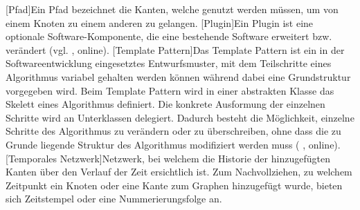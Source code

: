 \begin{acronym}
    [Pfad]{Ein Pfad bezeichnet die Kanten, welche genutzt werden müssen, um von einem Knoten zu einem anderen zu gelangen.}
    [Plugin]{Ein Plugin ist eine optionale Software-Komponente, die eine bestehende Software erweitert bzw. verändert (vgl. \citeauthor{wikipedia_plug-_2019} \citeyear{wikipedia_plug-_2019}, online).}
    [Template Pattern]{Das Template Pattern ist ein in der Softwareentwicklung eingesetztes Entwurfsmuster, mit dem Teilschritte eines Algorithmus variabel gehalten werden können während dabei eine Grundstruktur vorgegeben wird. Beim Template Pattern wird in einer abstrakten Klasse das Skelett eines Algorithmus definiert. Die konkrete Ausformung der einzelnen Schritte wird an Unterklassen delegiert. Dadurch besteht die Möglichkeit, einzelne Schritte des Algorithmus zu verändern oder zu überschreiben, ohne dass die zu Grunde liegende Struktur des Algorithmus modifiziert werden muss (\citeauthor{wikipedia_schablonenmethode_2018} \citeyear{wikipedia_schablonenmethode_2018}, online).}
    [Temporales Netzwerk]{Netzwerk, bei welchem die Historie der hinzugefügten Kanten über den Verlauf der Zeit ersichtlich ist. Zum Nachvollziehen, zu welchem Zeitpunkt ein Knoten oder eine Kante zum Graphen hinzugefügt wurde, bieten sich Zeitstempel oder eine Nummerierungsfolge an.}
\end{acronym}

